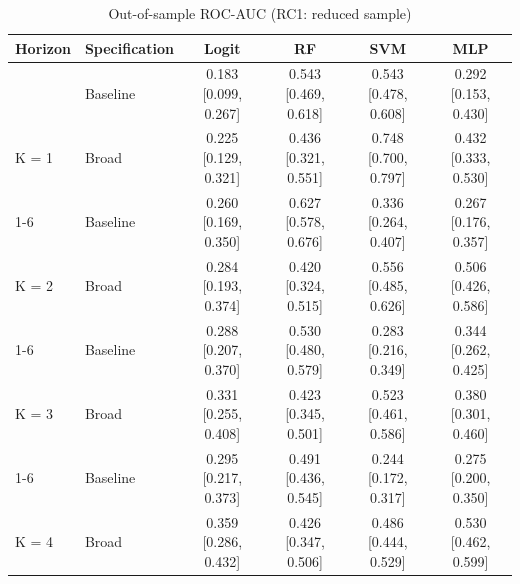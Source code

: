 \begin{table}

\caption{\label{tab:roc_ci_rc1}Out-of-sample ROC-AUC (RC1: reduced sample)}
\centering
\begin{tabular}[t]{llcccc}
\toprule
Horizon & Specification & Logit & RF & SVM & MLP\\
\midrule
 & Baseline & 0.183 [0.099, 0.267] & 0.543 [0.469, 0.618] & 0.543 [0.478, 0.608] & 0.292 [0.153, 0.430]\\

\multirow[t]{-1}{*}[\normalbaselineskip]{\raggedright\arraybackslash K = 1} & Broad & 0.225 [0.129, 0.321] & 0.436 [0.321, 0.551] & 0.748 [0.700, 0.797] & 0.432 [0.333, 0.530]\\
\cmidrule{1-6}
 & Baseline & 0.260 [0.169, 0.350] & 0.627 [0.578, 0.676] & 0.336 [0.264, 0.407] & 0.267 [0.176, 0.357]\\

\multirow[t]{-1}{*}[\normalbaselineskip]{\raggedright\arraybackslash K = 2} & Broad & 0.284 [0.193, 0.374] & 0.420 [0.324, 0.515] & 0.556 [0.485, 0.626] & 0.506 [0.426, 0.586]\\
\cmidrule{1-6}
 & Baseline & 0.288 [0.207, 0.370] & 0.530 [0.480, 0.579] & 0.283 [0.216, 0.349] & 0.344 [0.262, 0.425]\\

\multirow[t]{-1}{*}[\normalbaselineskip]{\raggedright\arraybackslash K = 3} & Broad & 0.331 [0.255, 0.408] & 0.423 [0.345, 0.501] & 0.523 [0.461, 0.586] & 0.380 [0.301, 0.460]\\
\cmidrule{1-6}
 & Baseline & 0.295 [0.217, 0.373] & 0.491 [0.436, 0.545] & 0.244 [0.172, 0.317] & 0.275 [0.200, 0.350]\\

\multirow[t]{-1}{*}[\normalbaselineskip]{\raggedright\arraybackslash K = 4} & Broad & 0.359 [0.286, 0.432] & 0.426 [0.347, 0.506] & 0.486 [0.444, 0.529] & 0.530 [0.462, 0.599]\\
\bottomrule
\end{tabular}
\end{table}

